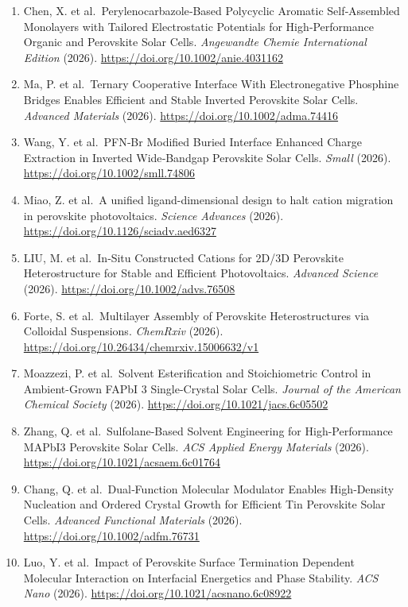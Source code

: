 \documentclass[
  11pt,
]{article}
\begin{document}
\begin{enumerate}
\item
  Chen, X. et al.~Perylenocarbazole‐Based Polycyclic Aromatic
  Self‐Assembled Monolayers with Tailored Electrostatic Potentials for
  High‐Performance Organic and Perovskite Solar Cells. \emph{Angewandte
  Chemie International Edition} (2026).
  \url{https://doi.org/10.1002/anie.4031162}
\item
  Ma, P. et al.~Ternary Cooperative Interface With Electronegative
  Phosphine Bridges Enables Efficient and Stable Inverted Perovskite
  Solar Cells. \emph{Advanced Materials} (2026).
  \url{https://doi.org/10.1002/adma.74416}
\item
  Wang, Y. et al.~PFN‐Br Modified Buried Interface Enhanced Charge
  Extraction in Inverted Wide‐Bandgap Perovskite Solar Cells.
  \emph{Small} (2026). \url{https://doi.org/10.1002/smll.74806}
\item
  Miao, Z. et al.~A unified ligand-dimensional design to halt cation
  migration in perovskite photovoltaics. \emph{Science Advances} (2026).
  \url{https://doi.org/10.1126/sciadv.aed6327}
\item
  LIU, M. et al.~In‐Situ Constructed Cations for 2D/3D Perovskite
  Heterostructure for Stable and Efficient Photovoltaics. \emph{Advanced
  Science} (2026). \url{https://doi.org/10.1002/advs.76508}
\item
  Forte, S. et al.~Multilayer Assembly of Perovskite Heterostructures
  via Colloidal Suspensions. \emph{ChemRxiv} (2026).
  \url{https://doi.org/10.26434/chemrxiv.15006632/v1}
\item
  Moazzezi, P. et al.~Solvent Esterification and Stoichiometric Control
  in Ambient-Grown FAPbI 3 Single-Crystal Solar Cells. \emph{Journal of
  the American Chemical Society} (2026).
  \url{https://doi.org/10.1021/jacs.6c05502}
\item
  Zhang, Q. et al.~Sulfolane-Based Solvent Engineering for
  High-Performance MAPbI3 Perovskite Solar Cells. \emph{ACS Applied
  Energy Materials} (2026). \url{https://doi.org/10.1021/acsaem.6c01764}
\item
  Chang, Q. et al.~Dual‐Function Molecular Modulator Enables
  High‐Density Nucleation and Ordered Crystal Growth for Efficient Tin
  Perovskite Solar Cells. \emph{Advanced Functional Materials} (2026).
  \url{https://doi.org/10.1002/adfm.76731}
\item
  Luo, Y. et al.~Impact of Perovskite Surface Termination Dependent
  Molecular Interaction on Interfacial Energetics and Phase Stability.
  \emph{ACS Nano} (2026). \url{https://doi.org/10.1021/acsnano.6c08922}

\end{enumerate}
\end{document}
